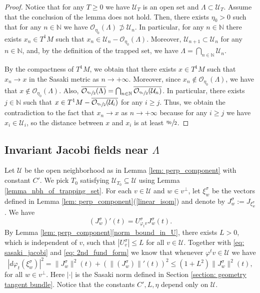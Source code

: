 \documentclass[10pt]{amsart}
\theoremstyle{definition}
\let\phi\varphi
\renewcommand{\>}{{\rangle}}
\newcommand{\<}{{\langle}}
\begin{document}
\begin{proof}
Notice that for any $T\geq 0$ we have $\mathcal U_T$ is an open set and $\Lambda\subset \mathcal U_T$. Assume that the conclusion of the lemma does not hold. Then, there exists $\eta_0>0$ such that for any $n\in\mathbb N$ we have $\mathcal O_{\eta_0}(\Lambda)\not\supset \mathcal U_n$. In particular, for any $n\in\mathbb N$ there exists $x_n\in T^1M$ such that $x_n\in \mathcal U_n - \mathcal O_{\eta_0}(\Lambda)$. Moreover, $\mathcal U_{n+1}\subset\mathcal U_{n}$ for any $n\in\mathbb N$, and, by the definition of the trapped set, we have $\Lambda=\bigcap_{n\in\mathbb N}\mathcal U_{n}$.

By the compactness of $T^1M$, we obtain that there exists $x\in T^1M$ such that $x_n\to x$ in the Sasaki metric as $n\to +\infty$. Moreover, since $x_n\notin \mathcal O_{\eta_0}(\Lambda)$, we have that $x\notin \mathcal O_{\eta_0}(\Lambda)$. Also, $\overline{\mathcal O_{\sfrac{\eta_0}{2}}(\Lambda)}=\bigcap_{n\in\mathbb N}\overline{\mathcal O_{\sfrac{\eta_0}{2}}(\mathcal U_{n})}$. In particular, there exists $j\in\mathbb N$ such that $x\in T^1M - \overline{\mathcal O_{\sfrac{\eta_0}{2}}(\mathcal U_i)}$ for any $i\geq j$. Thus, we obtain the contradiction to the fact that $x_n\to x$ as $n\to +\infty$ because for any $i\geq j$ we have $x_i\in \mathcal U_i$, so the distance between $x$ and $x_i$ is at least $\sfrac{\eta_0}{2}$.
\end{proof}

\subsection{Invariant Jacobi fields near \texorpdfstring{$\Lambda$}{La}}

Let $\mathcal{U}$ be the open neighborhood as in Lemma \ref{lem: perp_component} with constant $C'$. We pick $T_0$ satisfying $\mathcal{U}_{T_0}\subseteq \mathcal{U}$ using Lemma \ref{lemma_nbh_of_trapping_set}. For each $v\in \mathcal{U}$ and $w\in v^\perp$, let $\xi^{\sigma}_w$ be the vectors defined in Lemma \ref{lem: perp_component}(\ref{linear_isom}) and denote by $J^{\sigma}_{w}:=J_{\xi^{\sigma}_w}$. We have
\begin{equation}\label{eq: 2nd_fund_form}
(J^{\sigma}_{w})'(t)=U_{\phi_t v}^{\sigma}J^{\sigma}_{w}(t).
\end{equation}
By Lemma \ref{lem: perp_component}\eqref{norm_bound_in_U}, there exists $L\!>\!0$, which is independent of $v$, such that
$|U^\sigma_{v}|\!\leq\! L$ for all $v\in \mathcal{U}.$ Together with \eqref{eq: sasaki_jacobi} and \eqref{eq: 2nd_fund_form} we know that whenever $\phi^tv\in \mathcal{U}$ we have
\begin{equation}\label{eq: U_bound}
|d\phi_t(\xi^{\sigma}_w)|^2=\|J^{\sigma}_w\|^2(t)+\left(\|(J^{\sigma}_w)\|'(t)\right)^2\leq (1+L^2)\|J_w^{\sigma}\|^2(t),
\end{equation}
for all $w\in v^{\perp}$. Here $|{\cdot}|$ is the Sasaki norm defined in Section \ref{section: geometry tangent bundle}. Notice that the constants $C', L, \eta$ depend only on $\mathcal{U}$.
\end{document}
